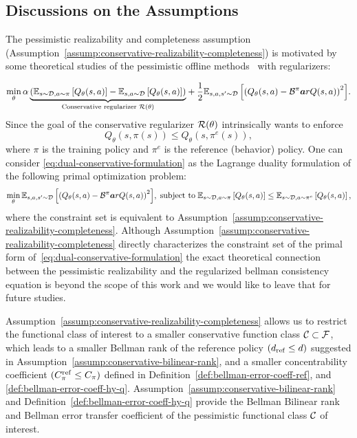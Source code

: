 \vspace{-0.2cm}
\subsection{Discussions on the Assumptions}
\vspace{-0.2cm}
The pessimistic realizability and completeness assumption (Assumption~\ref{assump:conservative-realizability-completeness}) is motivated by some theoretical studies of the pessimistic offline methods~\cite{xie2021bellman,cheng2022adversarially} with regularizers:

\begin{align}
    \label{eq:dual-conservative-formulation}
    \min_\theta  {\alpha \underbrace{\left(\mathbb{E}_{s \sim \mathcal{D}, a \sim \pi} \left[Q_\theta(s,a)\right] - \mathbb{E}_{s, a \sim \mathcal{D}}\left[Q_\theta(s,a)\right]\right)}_{\text{Conservative regularizer }\mathcal{R}(\theta)}} + \frac{1}{2} {\mathbb{E}_{s, a, s^\prime\sim \mathcal{D}}\left[\left(Q_\theta(s, a) - \mathcal{B}^\pi\boldsymbol{a}r{Q}(s, a)\right)^2 \right]}.
\end{align}
Since the goal of the conservative regularizer $\mathcal R(\theta)$ intrinsically wants to enforce
\begin{equation}
    Q_\theta(s,\pi(s)) \leq Q_\theta(s,\pi^e(s)),
\end{equation}
where $\pi$ is the training policy and $\pi^e$ is the reference (behavior) policy. One can consider \eqref{eq:dual-conservative-formulation} as the Lagrange duality formulation of the following primal optimization problem:{\small
\begin{equation}
    \min_\theta    {\mathbb{E}_{s, a, s^\prime\sim \mathcal{D}}\left[\left(Q_\theta(s, a) - \mathcal{B}^\pi\boldsymbol{a}r{Q}(s, a)\right)^2 \right]},\;\text{subject to}\; \mathbb{E}_{s \sim \mathcal{D}, a \sim \pi} \left[Q_\theta(s,a)\right] \leq \mathbb{E}_{s\sim \mathcal{D},a\sim\pi^e}\left[Q_\theta(s,a)\right],
\end{equation}
}
where the constraint set is equivalent to Assumption~\ref{assump:conservative-realizability-completeness}. Although Assumption~\ref{assump:conservative-realizability-completeness} directly characterizes the constraint set of the primal form of~\eqref{eq:dual-conservative-formulation} the exact theoretical connection between the pessimistic realizability and the regularized bellman consistency equation is beyond the scope of this work and we would like to leave that for future studies.

Assumption~\ref{assump:conservative-realizability-completeness} allows us to restrict the functional class of interest to a smaller conservative function class $\mathcal C\subset\mathcal F$, which leads to a smaller Bellman rank of the reference policy $(d_\mathrm{ref}\leq d)$ suggested in Assumption~\ref{assump:conservative-bilinear-rank}, and a smaller concentrability coefficient $(C^\mathrm{ref}_\pi\leq C_\pi)$ defined in Definition~\ref{def:bellman-error-coeff-ref}, and \ref{def:bellman-error-coeff-hy-q}. Assumption~\ref{assump:conservative-bilinear-rank} and Definition~\ref{def:bellman-error-coeff-hy-q} provide the Bellman Bilinear rank and Bellman error transfer coefficient of the pessimistic functional class $\mathcal C$ of interest.

